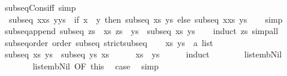 \begin{isabellebody}
\ subseq{\isacharunderscore}Cons{}{\isacharunderscore}iff\ {\isacharbrackleft}simp{\isacharbrackright}{\isacharcolon}\isanewline
\ \ {\isachardoublequoteopen}subseq\ {\isacharparenleft}x{\isacharhash}xs{\isacharparenright}\ {\isacharparenleft}y{\isacharhash}ys{\isacharparenright}\ {\isacharequal}\ {\isacharparenleft}if\ x\ {\isacharequal}\ y\ then\ subseq\ xs\ ys\ else\ subseq\ {\isacharparenleft}x{\isacharhash}xs{\isacharparenright}\ ys{\isacharparenright}{\isachardoublequoteclose}\isanewline
%
\isadelimproof
\ \ %
\endisadelimproof
%
\isatagproof
{}\isamarkupfalse%
\ simp%
\endisatagproof
{\isafoldproof}%
%
\isadelimproof
\isanewline
%
\endisadelimproof
\isanewline
{}\isamarkupfalse%
\ subseq{\isacharunderscore}append{\isacharprime}{\isacharcolon}\ {\isachardoublequoteopen}subseq\ {\isacharparenleft}zs\ {\isacharat}\ xs{\isacharparenright}\ {\isacharparenleft}zs\ {\isacharat}\ ys{\isacharparenright}\ {\isasymlongleftrightarrow}\ subseq\ xs\ ys{\isachardoublequoteclose}\isanewline
%
\isadelimproof
\ \ %
\endisadelimproof
%
\isatagproof
{}\isamarkupfalse%
\ {\isacharparenleft}induct\ zs{\isacharparenright}\ simp{\isacharunderscore}all%
\endisatagproof
{\isafoldproof}%
%
\isadelimproof
\isanewline
%
\endisadelimproof
\ \ \ \ \isanewline
{}\isamarkupfalse%
\ subseq{\isacharunderscore}order{\isacharcolon}\ order\ subseq\ strict{\isacharunderscore}subseq\isanewline
%
\isadelimproof
%
\endisadelimproof
%
\isatagproof
{}\isamarkupfalse%
\isanewline
\ \ \isamarkupfalse%
\ xs\ ys\ {\isacharcolon}{\isacharcolon}\ {\isachardoublequoteopen}{\isacharprime}a\ list{\isachardoublequoteclose}\isanewline
\ \ \isacommand{{\isacharbraceleft}}\isamarkupfalse%
\isanewline
\ \ \ \ \isamarkupfalse%
\ {\isachardoublequoteopen}subseq\ xs\ ys{\isachardoublequoteclose}\ \ {\isachardoublequoteopen}subseq\ ys\ xs{\isachardoublequoteclose}\isanewline
\ \ \ \ \isamarkupfalse%
\ {\isachardoublequoteopen}xs\ {\isacharequal}\ ys{\isachardoublequoteclose}\isanewline
\ \ \ \ \isamarkupfalse%
\ {\isacharparenleft}induct{\isacharparenright}\isanewline
\ \ \ \ \ \ \isamarkupfalse%
\ list{\isacharunderscore}emb{\isacharunderscore}Nil\isanewline
\ \ \ \ \ \ \isamarkupfalse%
\ list{\isacharunderscore}emb{\isacharunderscore}Nil{}\ {\isacharbrackleft}OF\ this{\isacharbrackright}\ \isamarkupfalse%
\ {\isacharquery}case\ \isamarkupfalse%
\ simp\isanewline

\end{isabellebody}
